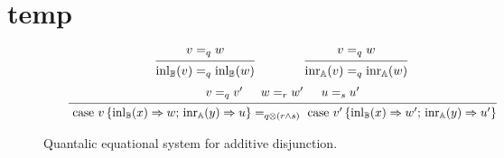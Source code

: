 \documentclass[submission,copyright,creativecommons]{eptcs}
\begin{document}
\section{temp}

  \begin{figure}[h!]
    \begin{equation*}
            \hspace{75pt}
            \begin{prooftree}
                    \hypo{ v =_q w}
                    \infer1[]{\inl_\typeB(v) =_q \inl_\typeB(w)}
            \end{prooftree}
            \hspace{40pt}
            \begin{prooftree}
                    \hypo{ v =_q w}
                    \infer1[]{\inr_\typeA(v) =_q \inr_\typeA(w)}
            \end{prooftree}
    \end{equation*}
    \begin{equation*}
    \hspace{20pt}
   \begin{prooftree}
      \hypo{ v =_{q} v' }
      \hypo{w=_{r} w'}
      \hypo{u=_{s}u'}
      \infer3[]{\text{ case } v \,   \{\inl_\typeB (x) \Rightarrow w ; \, \inr_\typeA (y) 
              \Rightarrow u\} 
      =_{q\otimes(r \wedge s)} 
      \text{ case } v' 
      \,  \{\inl_\typeB (x) \Rightarrow w' ; \,\inr_\typeA (y) \Rightarrow u'\} }
  \end{prooftree}
    \end{equation*}
    \caption{Quantalic equational system for additive disjunction.}
    \label{fig:equations-in-context-cond}
    \end{figure}





\end{document}
